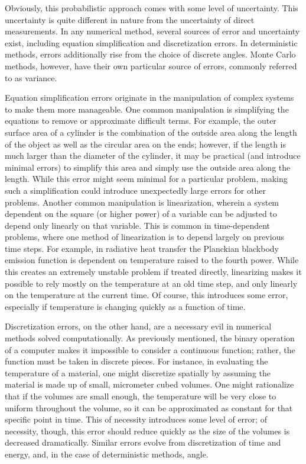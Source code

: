 Obviously, this probabilistic approach comes with some level of uncertainty.  This uncertainty is quite different in nature from the uncertainty of direct measurements.  In any numerical method, several sources of error and uncertainty exist, including equation simplification and  discretization errors.  In deterministic methods, errors additionally rise from the choice of discrete angles.  Monte Carlo methods, however, have their own particular source of errors, commonly referred to as variance.

Equation simplification errors originate in the manipulation of complex systems to make them more manageable.  One common manipulation is simplifying the equations to remove or approximate difficult terms.  For example, the outer surface area of a cylinder is the combination of the outside area along the length of the object as well as the circular area on the ends; however, if the length is much larger than the diameter of the cylinder, it may be practical (and introduce minimal errors) to simplify this area and simply use the outside area along the length.  While this error might seem minimal for a particular problem, making such a simplification could introduce unexpectedly large errors for other problems.  Another common manipulation is linearization, wherein a system dependent on the square (or higher power) of a variable can be adjusted to depend only linearly on that variable.  This is common in time-dependent problems, where one method of linearization is to depend largely on previous time steps.  For example, in radiative heat transfer the Planckian blackbody emission function is dependent on temperature raised to the fourth power.  While this creates an extremely unstable problem if treated directly, linearizing makes it possible to rely mostly on the temperature at an old time step, and only linearly on the temperature at the current time.  Of course, this introduces some error, especially if temperature is changing quickly as a function of time.

Discretization errors, on the other hand, are a necessary evil in numerical methods solved computationally.  As previously mentioned, the binary operation of a computer makes it impossible to consider a continuous function; rather, the function must be taken in discrete pieces.  For instance, in evaluating the temperature of a material, one might discretize spatially by assuming the material is made up of small, micrometer cubed volumes.  One might rationalize that if the volumes are small enough, the temperature will be very close to uniform throughout the volume, so it can be approximated as constant for that specific point in time.  This of necessity introduces some level of error; of necessity, though, this error should reduce quickly as the size of the volumes is decreased dramatically.  Similar errors evolve from discretization of time and energy, and, in the case of deterministic methods, angle.

